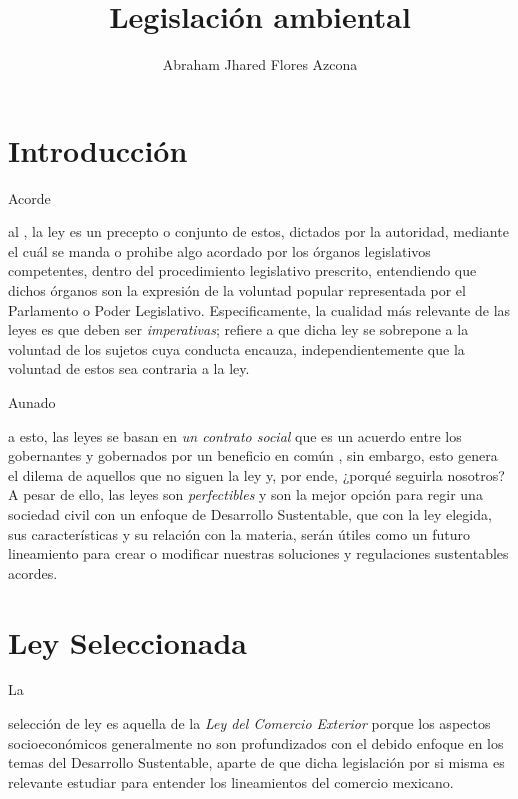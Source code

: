 \documentclass[stu, 12pt, letterpaper, donotrepeattitle, floatsintext, natbib]{apa7}
\title{\Large Legislación ambiental}
\author{Abraham Jhared Flores Azcona} %
\affiliation{Instituto Tecnológico de Tijuana}
\begin{document}
\maketitle


\renewcommand\contentsname{Contenido}
\tableofcontents

\newpage
\section*{Introducción}
Acorde \begin{justifying}
    al \cite{sistema-de-informacion-legislativa-no-date}, la ley es un precepto o conjunto de estos, dictados por la autoridad, mediante el cuál se manda o prohibe algo acordado por los
    órganos legislativos competentes, dentro del procedimiento legislativo prescrito, entendiendo que dichos órganos son la expresión de la
    voluntad popular representada por el Parlamento o Poder Legislativo. Especificamente, la cualidad más relevante de las leyes es que deben
    ser \emph{imperativas}; refiere a que dicha ley se sobrepone a la voluntad de los sujetos cuya conducta encauza, independientemente que la
    voluntad de estos sea contraria a la ley.\par 
\end{justifying}
Aunado \begin{justifying}
  a esto, las leyes se basan en \emph{un contrato social}
que es un acuerdo entre los gobernantes y gobernados por un beneficio en común \citep{unknown-author-2021}, %
sin embargo, esto genera el dilema de aquellos que no siguen la ley y, por ende, ¿porqué seguirla nosotros? A pesar de ello, las leyes
son \emph{perfectibles} y son la mejor opción para regir una sociedad civil con un enfoque de Desarrollo Sustentable, que con la ley elegida, sus características
y su relación con la materia, serán útiles como un futuro lineamiento para crear o modificar nuestras soluciones y regulaciones sustentables acordes.\par
\end{justifying}
\vspace{\baselineskip}
\section{Ley Seleccionada}
La \begin{justifying}
    selección de ley es aquella de la \emph{Ley del Comercio Exterior} porque los aspectos socioeconómicos generalmente no son profundizados con el debido enfoque en los temas del
    Desarrollo Sustentable, aparte de que dicha legislación por si misma es relevante estudiar para entender los lineamientos del comercio mexicano.\par
\end{justifying}
\vspace{\baselineskip}
\end{document}
